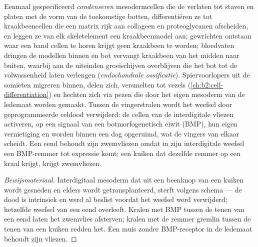\begin{proposition}\label{prop:b2:limb-organogenesis:skeleton}
Eenmaal gespecificeerd \emph{condenseren} mesodermcellen die de
 verlaten tot staven en platen met de vorm van de toekomstige
botten, differentiëren ze tot kraakbeencellen die een matrix rijk aan
collageen en proteoglycanen afscheiden, en leggen ze van elk
skeletelement een kraakbeenmodel aan; gewrichten ontstaan waar een band
cellen te horen krijgt geen kraakbeen te worden; bloedvaten dringen de
modellen binnen en bot vervangt kraakbeen van het midden naar buiten,
waarbij aan de uiteinden groeischijven overblijven die het bot tot de
volwassenheid laten verlengen (\emph{endochondrale ossificatie}).
Spiervoorlopers uit de somieten migreren binnen, delen zich, versmelten
tot vezels (\cref{ch:b2:cell-differentiation}) en hechten zich via pezen
die door het eigen mesoderm van de ledemaat worden gemaakt. Tussen de
vingerstralen wordt het weefsel door geprogrammeerde celdood verwijderd: de
cellen van de interdigitale vliezen activeren, op een signaal van een
botmorfogenetisch eiwit (BMP), hun eigen vernietiging en worden binnen een
dag opgeruimd, wat de vingers van elkaar scheidt. Een eend behoudt zijn
zwemvliezen omdat in zijn interdigitale weefsel een BMP-remmer tot
expressie komt; een kuiken dat dezelfde remmer op een kraal krijgt, krijgt
zwemvliezen.
\end{proposition}
\begin{proof}[Bewijsmateriaal]
Interdigitaal mesoderm dat uit een beenknop van een kuiken wordt gesneden
en elders wordt getransplanteerd, sterft volgens schema --- de dood is
intrinsiek en werd al beslist voordat het weefsel werd verwijderd;
hetzelfde weefsel van een eend overleeft. Kralen met BMP tussen de tenen van
een eend laten het zwemvlies afsterven; kralen met de remmer gremlin tussen
de tenen van een kuiken redden het. Een muis zonder BMP-receptor in de
ledemaat behoudt zijn vliezen.
\end{proof}

